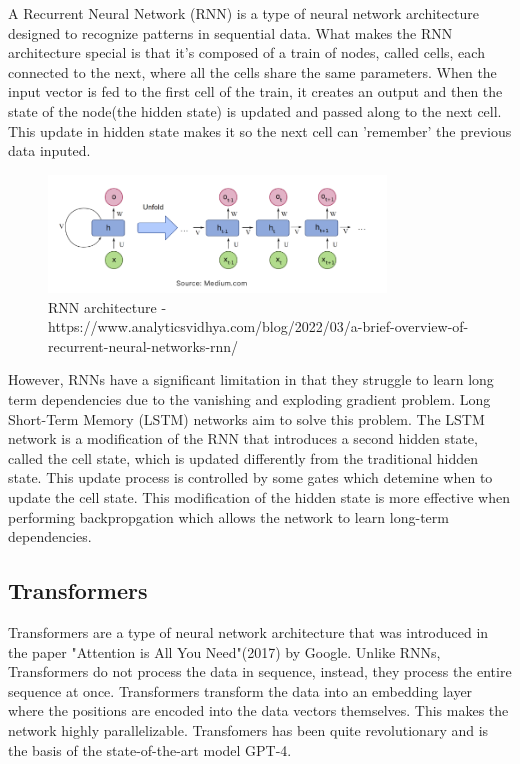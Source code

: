 \documentclass[11pt]{article}
\begin{document}
A Recurrent Neural Network (RNN) is a type of neural network architecture designed to recognize patterns in sequential data. What makes the RNN architecture special is that it's composed of a train of nodes, called cells, each connected to the next, where all the cells share the same parameters. When the input vector is fed to the first cell of the train, it creates an output and then the state of the node(the hidden state) is updated and passed along to the next cell. This update in hidden state makes it so the next cell can 'remember' the previous data inputed. 

\begin{figure}[h]
\centering
\includegraphics[width=0.8\textwidth]{rnn.png}
\caption{RNN architecture - https://www.analyticsvidhya.com/blog/2022/03/a-brief-overview-of-recurrent-neural-networks-rnn/}
\end{figure}

However, RNNs have a significant limitation in that they struggle to learn long term dependencies due to the vanishing and exploding gradient problem. Long Short-Term Memory (LSTM) networks  aim to solve this problem. The LSTM network is a modification of the RNN that introduces a second hidden state, called the cell state, which is updated differently from the traditional hidden state. This update process is controlled by some gates which detemine when to update the cell state. This modification of the hidden state is more effective when performing backpropgation which allows the network to learn long-term dependencies.

\subsection{Transformers}

Transformers are a type of neural network architecture that was introduced in the paper "Attention is All You Need"(2017) by Google. Unlike RNNs, Transformers do not process the data in sequence, instead, they process the entire sequence at once. Transformers transform the data into an embedding layer where the positions are encoded into the data vectors themselves. This makes the network highly parallelizable. Transfomers has been quite revolutionary and is the basis of the state-of-the-art model GPT-4.
\end{document}
